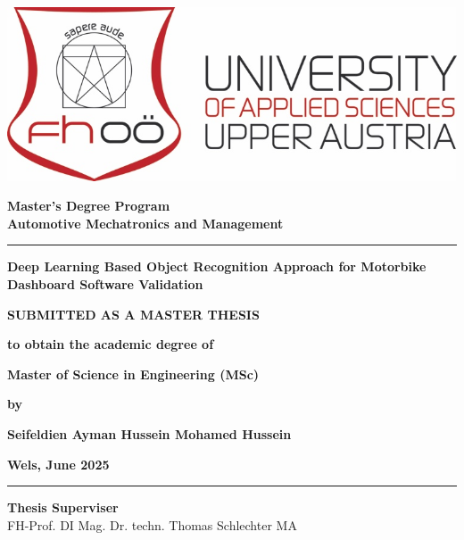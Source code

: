 \begin{titlepage}
    \begin{center}
        
        \includegraphics[width=0.6\linewidth]{Figures/FH_Logo.png}
        
        \vspace{0.5cm}

        \textbf{Master’s Degree Program}\\
        \textbf{Automotive Mechatronics and Management}\\

        \rule{\linewidth}{0.4pt}
        
        \LARGE \textbf{Deep Learning Based Object Recognition Approach for Motorbike Dashboard Software Validation}\\
        
        \vspace{0.9cm}
        
        \normalsize\textbf{SUBMITTED AS A MASTER THESIS} \\
        
        \vspace{0.9cm}
        
        \textbf{to obtain the academic degree of} \\

        \vspace{0.9cm}

        \textbf{Master of Science in Engineering (MSc)} \\
        
        \vspace{0.9cm}
        
        \textbf{by}\\

        \vspace{0.9cm}

        \textbf{Seifeldien Ayman Hussein Mohamed Hussein}\\

        \vspace{0.9cm}

        \textbf{ Wels, June 2025}
        
        \vspace{0.9cm}

        \rule{\linewidth}{0.4pt}
        \textbf{Thesis Superviser}\\
        \large FH-Prof. DI Mag. Dr. techn. Thomas Schlechter MA \\
        
        \vfill
        
    \end{center}
\end{titlepage}
